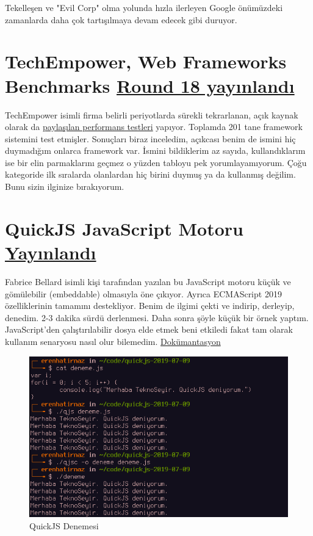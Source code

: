 \documentclass[11pt]{article}
\begin{document}
Tekelleşen ve "Evil Corp" olma yolunda hızla ilerleyen Google önümüzdeki
zamanlarda daha çok tartışılmaya devam edecek gibi duruyor.
\section{TechEmpower, Web Frameworks Benchmarks \href{https://www.techempower.com/benchmarks/}{Round 18 yayınlandı}}
\label{sec:orga1a5c5c}
TechEmpower isimli firma belirli periyotlarda sürekli tekrarlanan, açık kaynak
olarak da \href{https://github.com/TechEmpower/FrameworkBenchmarks}{paylaşılan performans testleri} yapıyor. Toplamda 201 tane framework
sistemini test etmişler. Sonuçları biraz inceledim, açıkcası benim de ismini
hiç duymadığım onlarca framework var. İsmini bildiklerim az sayıda,
kullandıklarım ise bir elin parmaklarını geçmez o yüzden tabloyu pek
yorumlayamıyorum. Çoğu kategoride ilk sıralarda olanlardan hiç birini duymuş
ya da kullanmış değilim. Bunu sizin ilginize bırakıyorum.
\section{QuickJS JavaScript Motoru \href{https://bellard.org/quickjs/}{Yayınlandı}}
\label{sec:org9d81c22}
Fabrice Bellard isimli kişi tarafından yazılan bu JavaScript motoru küçük ve
gömülebilir (embeddable) olmasıyla öne çıkıyor. Ayrıca ECMAScript 2019
özelliklerinin tamamını destekliyor. Benim de ilgimi çekti ve indirip,
derleyip, denedim. 2-3 dakika sürdü derlenmesi. Daha sonra şöyle küçük bir
örnek yaptım. JavaScript'den çalıştırılabilir dosya elde etmek beni etkiledi
fakat tam olarak kullanım senaryosu nasıl olur bilemedim. \href{https://bellard.org/quickjs/quickjs.html}{Dokümantasyon}

\begin{figure}[htbp]
\centering
\includegraphics[width=.9\linewidth]{gorseller/quickjs-ts.png}
\caption{QuickJS Denemesi}
\end{figure}
\end{document}
